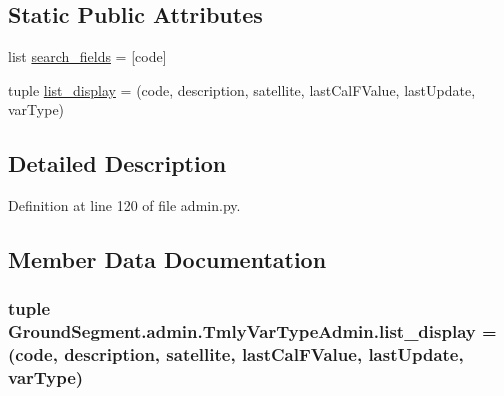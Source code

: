 \subsection*{Static Public Attributes}
\begin{DoxyCompactItemize}
\item 
list \hyperlink{class_ground_segment_1_1admin_1_1_tmly_var_type_admin_aa4fbcc6eced9e293ccee1adc138c4728}{search\+\_\+fields} = \mbox{[}\textquotesingle{}code\textquotesingle{}\mbox{]}
\item 
tuple \hyperlink{class_ground_segment_1_1admin_1_1_tmly_var_type_admin_aa75f4221ac105012fa994d5022cafd6c}{list\+\_\+display} = (\textquotesingle{}code\textquotesingle{}, \textquotesingle{}description\textquotesingle{}, \textquotesingle{}satellite\textquotesingle{}, \textquotesingle{}last\+Cal\+F\+Value\textquotesingle{}, \textquotesingle{}last\+Update\textquotesingle{}, \textquotesingle{}var\+Type\textquotesingle{})
\end{DoxyCompactItemize}


\subsection{Detailed Description}


Definition at line 120 of file admin.\+py.



\subsection{Member Data Documentation}
\hypertarget{class_ground_segment_1_1admin_1_1_tmly_var_type_admin_aa75f4221ac105012fa994d5022cafd6c}{}
\subsubsection[{list\+\_\+display}]{\setlength{\rightskip}{0pt plus 5cm}tuple Ground\+Segment.\+admin.\+Tmly\+Var\+Type\+Admin.\+list\+\_\+display = (\textquotesingle{}code\textquotesingle{}, \textquotesingle{}description\textquotesingle{}, \textquotesingle{}satellite\textquotesingle{}, \textquotesingle{}last\+Cal\+F\+Value\textquotesingle{}, \textquotesingle{}last\+Update\textquotesingle{}, \textquotesingle{}var\+Type\textquotesingle{})\hspace{0.3cm}{\ttfamily [static]}}\label{class_ground_segment_1_1admin_1_1_tmly_var_type_admin_aa75f4221ac105012fa994d5022cafd6c}


